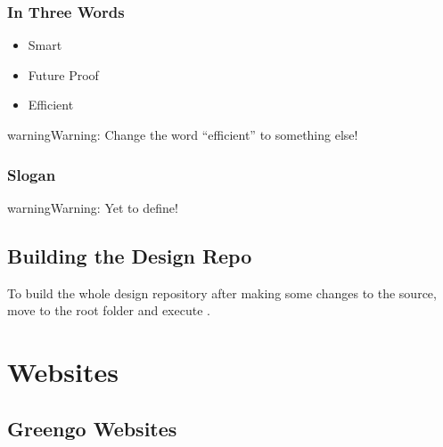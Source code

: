\documentclass[letterpaper,10pt,english]{sphinxmanual}
\begin{document}
\subsection{In Three Words}
\label{\detokenize{design/branding:in-three-words}}\begin{itemize}
\item {} 
Smart

\item {} 
Future Proof

\item {} 
Efficient

\end{itemize}

\begin{sphinxadmonition}{warning}{Warning:}
Change the word “efficient” to something else!
\end{sphinxadmonition}


\subsection{Slogan}
\label{\detokenize{design/branding:slogan}}
\begin{sphinxadmonition}{warning}{Warning:}
Yet to define!
\end{sphinxadmonition}


\section{Building the Design Repo}
\label{\detokenize{design/building:building-the-design-repo}}\label{\detokenize{design/building::doc}}
To build the whole design repository after making some changes to the source, move to the root folder and execute .


\chapter{Websites}
\label{\detokenize{websites/index:websites}}\label{\detokenize{websites/index::doc}}

\section{Greengo Websites}
\label{\detokenize{websites/greengo_websites:greengo-websites}}\label{\detokenize{websites/greengo_websites::doc}}
\end{document}
